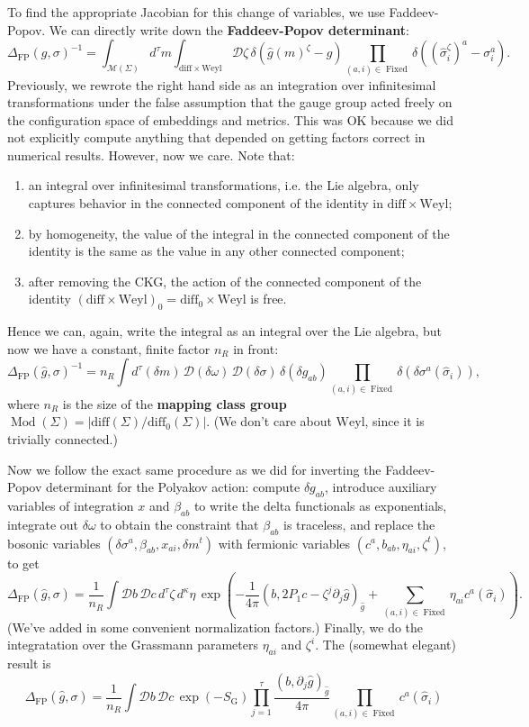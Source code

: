 \documentclass{report}
\theoremstyle{plain}
\theoremstyle{definition}
\theoremstyle{remark}
\newcommand{\di}{\partial}
\newcommand{\cD}{\mathcal{D}}
\newcommand{\cM}{\mathcal{M}}
\newcommand{\diff}{\mathrm{diff}}
\newcommand{\Weyl}{\mathrm{Weyl}}
\DeclareMathOperator{\Mod}{Mod}
\DeclareMathOperator{\Fixed}{Fixed}
\begin{document}
To find the appropriate Jacobian for this change of variables, we use
Faddeev-Popov. We can directly write down the {\bf Faddeev-Popov
  determinant}:
\[ \Delta_{\text{FP}}(g, \sigma)^{-1} = \int_{\cM(\Sigma)} d^\tau m \int_{\diff \times \Weyl} \cD \zeta \, \delta(\hat{g}(m)^\zeta - g) \prod_{(a, i) \in \Fixed} \delta((\hat{\sigma}_i^\zeta)^a - \sigma_i^a). \]
Previously, we rewrote the right hand side as an integration over
infinitesimal transformations under the false assumption that the
gauge group acted freely on the configuration space of embeddings and
metrics. This was OK because we did not explicitly compute anything
that depended on getting factors correct in numerical results.
However, now we care. Note that:
\begin{enumerate}
\item an integral over infinitesimal transformations, i.e. the Lie
  algebra, only captures behavior in the connected component of the
  identity in $\diff \times \Weyl$;
\item by homogeneity, the value of the integral in the connected
  component of the identity is the same as the value in any other
  connected component;
\item after removing the CKG, the action of the connected component of
  the identity $(\diff \times \Weyl)_0 = \diff_0 \times \Weyl$ is free.
\end{enumerate}
Hence we can, again, write the integral as an integral over the Lie
algebra, but now we have a constant, finite factor $n_R$ in front:
\[ \Delta_{\text{FP}}(\hat{g}, \sigma)^{-1} = n_R \int d^\tau (\delta m) \, \cD(\delta \omega) \, \cD(\delta \sigma) \, \delta(\delta g_{ab}) \prod_{(a,i) \in \Fixed} \delta(\delta \sigma^a(\hat{\sigma}_i)), \]
where $n_R$ is the size of the {\bf mapping class group} $\Mod(\Sigma)
= |\diff(\Sigma)/\diff_0(\Sigma)|$. (We don't care about $\Weyl$,
since it is trivially connected.)

Now we follow the exact same procedure as we did for inverting the
Faddeev-Popov determinant for the Polyakov action: compute $\delta
g_{ab}$, introduce auxiliary variables of integration $x$ and
$\beta_{ab}$ to write the delta functionals as exponentials, integrate
out $\delta \omega$ to obtain the constraint that $\beta_{ab}$ is
traceless, and replace the bosonic variables $(\delta \sigma^a,
\beta_{ab}, x_{ai}, \delta m^t)$ with fermionic variables $(c^a,
b_{ab}, \eta_{ai}, \zeta^t)$, to get
\[ \Delta_{\text{FP}}(\hat{g}, \sigma) = \frac{1}{n_R} \int \cD b \, \cD c \, d^\tau \zeta \, d^\kappa \eta \, \exp\left(-\frac{1}{4\pi} (b, 2P_1 c - \zeta^j \di_j \hat{g})_{\hat{g}} + \sum_{(a,i) \in \Fixed} \eta_{ai} c^a(\hat{\sigma}_i)\right). \]
(We've added in some convenient normalization factors.) Finally, we do
the integratation over the Grassmann parameters $\eta_{ai}$ and
$\zeta^i$. The (somewhat elegant) result is
\[ \Delta_{\text{FP}}(\hat{g}, \sigma) = \frac{1}{n_R} \int \cD b \, \cD c \, \exp(-S_{\text{G}}) \prod_{j=1}^\tau \frac{(b, \di_j \hat{g})_{\hat{g}}}{4\pi} \prod_{(a,i) \in \Fixed} c^a(\hat{\sigma}_i) \]
\end{document}
